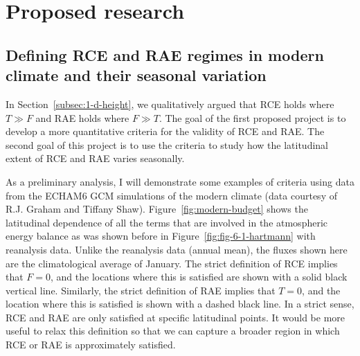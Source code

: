 \documentclass{article}
\begin{document}
\section{Proposed research}

\subsection{Defining RCE and RAE regimes in modern climate and their seasonal variation} \label{subsec:proposal-1}

In Section~\ref{subsec:1-d-height}, we qualitatively argued that RCE holds where $T \gg F$ and RAE holds where $F \gg T$. The goal of the first proposed project is to develop a more quantitative criteria for the validity of RCE and RAE. The second goal of this project is to use the criteria to study how the latitudinal extent of RCE and RAE varies seasonally.

As a preliminary analysis, I will demonstrate some examples of criteria using data from the ECHAM6 GCM simulations of the modern climate (data courtesy of R.J. Graham and Tiffany Shaw). Figure~\ref{fig:modern-budget} shows the latitudinal dependence of all the terms that are involved in the atmospheric energy balance as was shown before in Figure~\ref{fig:fig-6-1-hartmann} with reanalysis data. Unlike the reanalysis data (annual mean), the fluxes shown here are the climatological average of January. The strict definition of RCE implies that $F = 0$, and the locations where this is satisfied are shown with a solid black vertical line. Similarly, the strict definition of RAE implies that $T = 0$, and the location where this is satisfied is shown with a dashed black line. In a strict sense, RCE and RAE are only satisfied at specific latitudinal points. It would be more useful to relax this definition so that we can capture a broader region in which RCE or RAE is approximately satisfied.
\end{document}
